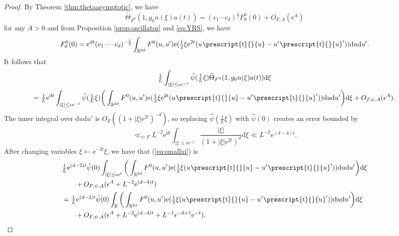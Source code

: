 \documentclass[12pt]{amsart}
\theoremstyle{definition}
\theoremstyle{remark}
\numberwithin{equation}{section}
\newcommand{\dd}{\mathrm{d}}
\newcommand{\R}{\mathbb{R}}
\newcommand{\e}{\mathrm{e}}
\newcommand*{\transp}[2][-1mu]{\ensuremath{\mskip1mu\prescript{\smash{\mathrm t\mkern#1}}{}{\mathstrut#2}}}
\begin{document}
\begin{proof}
By Theorem \ref{thm:thetaasymptotic}, we have
\begin{equation}
  \label{eq:Thetaasymptotic}
  \widetilde\Theta_{F^0}( 1, g_0 n(\xi) a(t ))  = ( v_1 \cdots v_d)^{\frac{1}{2}} F^0_\theta(0) + O_{F, A}(\epsilon^A)
\end{equation}
for any $A > 0$ and from Proposition \ref{prop:oscillator} and \eqref{eq:YRS}, we have
\begin{equation}
  \label{eq:fQ0}
  F^0_\theta(0) = \e^{dt} (v_1 \cdots v_d)^{-\frac{1}{2}} \int_{\mathbb{R}^{2d}} F^0(u,u') \e( \tfrac{1}{2} \xi \e^{2t} (u\transp{u}-u'\transp{u}') ) \dd u \dd u'.
\end{equation}
It follows that
\begin{multline}
  \label{eq:smallxi}
  \tfrac{1}{L} \int_{|\xi|\leq \epsilon \e^{-t}} \hat{\psi} ( \tfrac{1}{L}\xi ) \widetilde\Theta_{F^0}(1, g_0 n(\xi) a(t) ) \dd \xi \\
  = \tfrac{1}{L}\e^{dt} \int_{|\xi| \leq \epsilon \e^{-t}} \hat{\psi}( \tfrac{1}{L}\xi)  \bigg( \int_{\mathbb{R}^{2d}} F^0(u,u') \e( \tfrac{1}{2} \xi \e^{2t} (u\transp{u}-u'\transp{u}') ) \dd u \dd u'\bigg)  \dd \xi + O_{f, \psi, A}(\epsilon^A).
\end{multline}
The inner integral over $\dd u \dd u'$ is $O_{F}( (1 + |\xi| \e^{2t})^{-d})$, so replacing $\hat \psi(\tfrac{1}{L} \xi)$ with $\hat \psi(0)$ creates an error bounded by
\begin{equation}
  \label{eq:psi0replace}
  \ll_{\psi, F} L^{-2} \e^{dt} \int_{|\xi| \leq \epsilon \e^{-t}} \frac{ |\xi|}{(1 + |\xi| \e^{2t})^d} \dd \xi \ll L^{-2} \e^{(d-4)t}. 
\end{equation}
After changing variables $\xi \gets \e^{-2t} \xi$, we have that (\ref{eq:smallxi}) is 
\begin{equation}
\begin{split}
  \label{eq:smallxi1}
&\tfrac{1}{L} \e^{(d-2)t} \hat\psi(0)  \int_{|\xi| \leq \epsilon \e^{t}} \bigg( \int_{\mathbb{R}^{2d}} F^0(u,u') \e( \tfrac{1}{2} \xi (u\transp{u}-u'\transp{u}') ) \dd u \dd u'\bigg)  \dd \xi \\
&  \qquad + O_{F,\psi,A}(\epsilon^{A} + L^{-2} \e^{(d-4)t})\\
& = \tfrac{1}{L} \e^{(d-2)t} \hat \psi(0)  \int_\R \bigg( \int_{\mathbb{R}^{2d}} F^0(u,u') \e( \tfrac{1}{2} \xi (u\transp{u}-u'\transp{u}') ) \dd u \dd u'\bigg)  \dd \xi \\
 & \qquad + O_{F,\psi, A}(\epsilon^{A} + L^{-2} \e^{(d-4)t} + L^{-1} \epsilon^{-d + 1} \e^{-t}).
\end{split}

\end{equation}
\end{proof}
\end{document}
